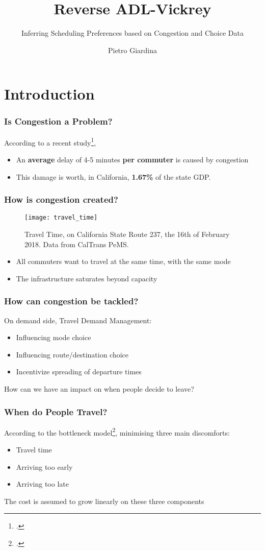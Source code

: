 \documentclass[hyperref={pdfpagelabels=false}]{beamer}
\title{Reverse ADL-Vickrey}
\subtitle{Inferring Scheduling Preferences based on Congestion and Choice Data}
\author{Pietro Giardina}
\begin{document}
\inserttitlepage


\section{Introduction} %
\begin{frame}
  \tableofcontents[currentsection]
\end{frame}

\begin{frame}
  \frametitle{Is Congestion a Problem?}
  According to a recent study\footcite{kim2022congestion},
  \begin{itemize}
  \item An \textbf{average} delay of 4-5 minutes \textbf{per commuter} is caused by congestion
  \item This damage is worth, in California, \textbf{1.67\%} of the state GDP.
  \end{itemize}
\end{frame}

\begin{frame}
  \frametitle{How is congestion created?}
  \begin{figure}
    \centering
    \texttt{[image: travel\_time]}
    \caption{Travel Time, on California State Route 237, the 16th of February 2018.
    Data from CalTrans PeMS.}
    \label{fig:tt}
  \end{figure}
  \begin{itemize}
  \item All commuters want to travel at the same time, with the same mode
  \item The infrastructure saturates beyond capacity
  \end{itemize}
\end{frame}

\begin{frame}
  \frametitle{How can congestion be tackled?}
  On demand side, Travel Demand Management:
  \begin{itemize}
  \item Influencing mode choice
  \item Influencing route/destination choice
  \item Incentivize spreading of departure times
  \end{itemize}

  How can we have an impact on when people decide to leave?
\end{frame}

\begin{frame}
  \frametitle{When do People Travel?}
  According to the bottleneck model\footcite{f32d6720-dd02-34b7-a4ba-c4c21193efe7, d0907f84-e14a-3d98-ad20-759f41491d6e},
  minimising three main discomforts:
  \begin{itemize}
  \item Travel time
  \item Arriving too early
  \item Arriving too late
  \end{itemize}

  The cost is assumed to grow linearly on these three components
\end{frame}
\end{document}
